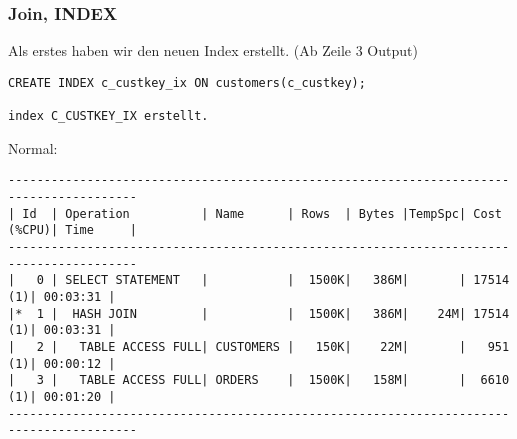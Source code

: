 \documentclass[11pt,a4paper,parskip=half]{scrartcl}
\begin{document}
\subsubsection{Join, INDEX}
Als erstes haben wir den neuen Index erstellt. (Ab Zeile 3 Output)
\begin{lstlisting}
CREATE INDEX c_custkey_ix ON customers(c_custkey);

index C_CUSTKEY_IX erstellt.
\end{lstlisting}

Normal:
\begin{lstlisting}
----------------------------------------------------------------------------------------                                                                                                                                                                                                                     
| Id  | Operation          | Name      | Rows  | Bytes |TempSpc| Cost (%CPU)| Time     |                                                                                                                                                                                                                     
----------------------------------------------------------------------------------------                                                                                                                                                                                                                     
|   0 | SELECT STATEMENT   |           |  1500K|   386M|       | 17514   (1)| 00:03:31 |                                                                                                                                                                                                                     
|*  1 |  HASH JOIN         |           |  1500K|   386M|    24M| 17514   (1)| 00:03:31 |                                                                                                                                                                                                                     
|   2 |   TABLE ACCESS FULL| CUSTOMERS |   150K|    22M|       |   951   (1)| 00:00:12 |                                                                                                                                                                                                                     
|   3 |   TABLE ACCESS FULL| ORDERS    |  1500K|   158M|       |  6610   (1)| 00:01:20 |                                                                                                                                                                                                                     
----------------------------------------------------------------------------------------                                                                                                                                                                                                                     
                                                                                                                                                                                                                                                                                                             

\end{lstlisting}
\end{document}
